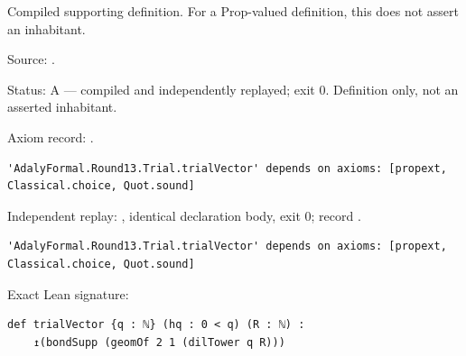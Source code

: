 \begin{definition}[bp-368]
\label{bp-368}
\leanok
Compiled supporting definition. For a Prop-valued definition, this does not assert an inhabitant.

\par Source: \texttt{}.
\par Status: A — compiled and independently replayed; exit 0. Definition only, not an asserted inhabitant.
\par Axiom record: \texttt{}.
\begin{verbatim}
'AdalyFormal.Round13.Trial.trialVector' depends on axioms: [propext, Classical.choice, Quot.sound]
\end{verbatim}
\par Independent replay: \texttt{}, identical declaration body, exit 0; record \texttt{}.
\begin{verbatim}
'AdalyFormal.Round13.Trial.trialVector' depends on axioms: [propext, Classical.choice, Quot.sound]
\end{verbatim}
\par Exact Lean signature:
\begin{verbatim}
def trialVector {q : ℕ} (hq : 0 < q) (R : ℕ) :
    ↥(bondSupp (geomOf 2 1 (dilTower q R)))
\end{verbatim}
\end{definition}

